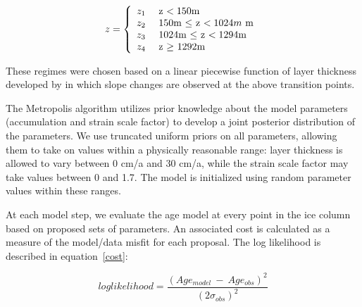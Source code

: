 \documentclass[12pt]{article}
\begin{document}
$$
z = \left\{ \begin{array}{rl}
z_1 & \mbox{  z $< 150$m } \\
z_2 & \mbox{  150m $\le$ z $< 1024 m$ m} \\
z_3 & \mbox{  1024m $\le$ z $ < 1294$m} \\
z_4 & \mbox{  z $\ge$ 1292m }\end{array} \right.
\\
$$

These regimes were chosen based on a linear piecewise function of layer thickness developed by \citet{hammer1994} in which slope changes are observed at the above transition points. %


The Metropolis algorithm utilizes prior knowledge about the model parameters (accumulation and strain scale factor) to develop a joint posterior distribution of the parameters. We use truncated uniform priors on all parameters, allowing them to take on values within a physically reasonable range: layer thickness is allowed to vary between 0 cm/a and 30 cm/a, while the strain scale factor may take values between 0 and 1.7.  The model is initialized using random parameter values within these ranges.

At each model step, we evaluate the age model at every point in the ice column based on proposed sets of parameters.  An associated cost is calculated as a measure of the model/data misfit for each proposal. The log likelihood is described in equation~\ref{cost}:

\begin{equation}\label{cost}
log likelihood = \frac{(Age_{model}~ - ~Age_{obs})^2}{(2\sigma_{obs})^2}
\end{equation}
\\
\end{document}
